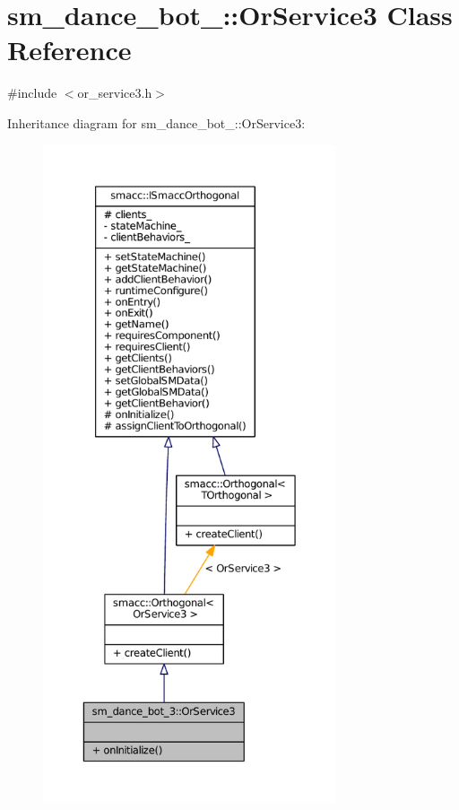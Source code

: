 \hypertarget{classsm__dance__bot__3_1_1OrService3}{}\section{sm\+\_\+dance\+\_\+bot\+\_\+:\+:Or\+Service3 Class Reference}
\label{classsm__dance__bot__3_1_1OrService3}


{\ttfamily \#include $<$or\+\_\+service3.\+h$>$}



Inheritance diagram for sm\+\_\+dance\+\_\+bot\+\_\+:\+:Or\+Service3\+:
\nopagebreak
\begin{figure}[H]
\begin{center}
\leavevmode
\includegraphics[height=550pt]{classsm__dance__bot__3_1_1OrService3__inherit__graph}
\end{center}
\end{figure}


